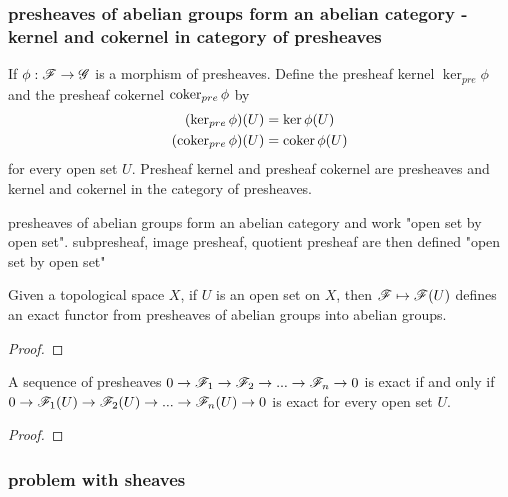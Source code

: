 \subsubsection{presheaves of abelian groups form an abelian category - kernel and cokernel in category of presheaves}

\begin{definition}
	If $\phi: \mathscr{F} \to \mathscr{G}$ is a morphism of presheaves. Define the presheaf kernel $\ker_{pre} \phi$ and the presheaf cokernel $\operatorname{coker}_{pre} \phi$ by
	\begin{align*}
		(\ker_{pre} \phi)(U) &= \ker \phi(U) \\
		(\operatorname{coker}_{pre} \phi)(U) &= \operatorname{coker} \phi(U)
	\end{align*}
	for every open set $U$. Presheaf kernel and presheaf cokernel are presheaves and kernel and cokernel in the category of presheaves.
\end{definition}

\begin{remark}
	presheaves of abelian groups form an abelian category and work "open set by open set". subpresheaf, image presheaf, quotient presheaf are then defined "open set by open set"
\end{remark}

\begin{proposition}
	Given a topological space $X$, if $U$ is an open set on $X$, then $\mathscr{F} \mapsto \mathscr{F}(U)$ defines an exact functor from presheaves of abelian groups into abelian groups.
\end{proposition}

\begin{proof}
\end{proof}

\begin{proposition}
	A sequence of presheaves $0 \to \mathscr{F}_1 \to \mathscr{F}_2 \to ... \to \mathscr{F}_n \to 0$ is exact if and only if $0 \to \mathscr{F}_1(U) \to \mathscr{F}_2(U) \to ... \to \mathscr{F}_n(U) \to 0$ is exact for every open set $U$.
\end{proposition}

\begin{proof}
\end{proof}

\subsubsection{problem with sheaves}

